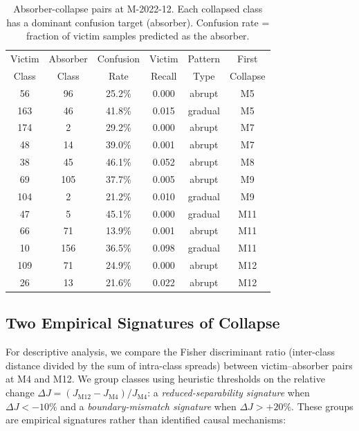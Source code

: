\documentclass[journal]{IEEEtran}
\begin{document}
\begin{table}[!htbp]
\centering
\caption{Absorber-collapse pairs at M-2022-12. Each collapsed class has a dominant confusion target (absorber). Confusion rate = fraction of victim samples predicted as the absorber.}
\label{tab:absorber_pairs}
\small
\begin{tabular}{@{}cccccc@{}}
\toprule
Victim & Absorber & Confusion & Victim & Pattern & First \\
Class  & Class    & Rate      & Recall & Type    & Collapse \\
\midrule
56  & 96  & 25.2\% & 0.000 & abrupt  & M5 \\
163 & 46  & 41.8\% & 0.015 & gradual & M5 \\
174 & 2   & 29.2\% & 0.000 & abrupt  & M7 \\
48  & 14  & 39.0\% & 0.001 & abrupt  & M7 \\
38  & 45  & 46.1\% & 0.052 & abrupt  & M8 \\
69  & 105 & 37.7\% & 0.005 & abrupt  & M9 \\
104 & 2   & 21.2\% & 0.010 & gradual & M9 \\
47  & 5   & 45.1\% & 0.000 & gradual & M11 \\
66  & 71  & 13.9\% & 0.001 & abrupt  & M11 \\
10  & 156 & 36.5\% & 0.098 & gradual & M11 \\
109 & 71  & 24.9\% & 0.000 & abrupt  & M12 \\
26  & 13  & 21.6\% & 0.022 & abrupt  & M12 \\
\bottomrule
\end{tabular}
\end{table}

\subsection{Two Empirical Signatures of Collapse}
\label{sec:mechanisms}

For descriptive analysis, we compare the Fisher discriminant ratio (inter-class distance divided by the sum of intra-class spreads) between victim--absorber pairs at M4 and M12. We group classes using heuristic thresholds on the relative change $\Delta J = (J_{\text{M12}} - J_{\text{M4}}) / J_{\text{M4}}$: a \textit{reduced-separability signature} when $\Delta J < -10\%$ and a \textit{boundary-mismatch signature} when $\Delta J > +20\%$. These groups are empirical signatures rather than identified causal mechanisms:
\end{document}
